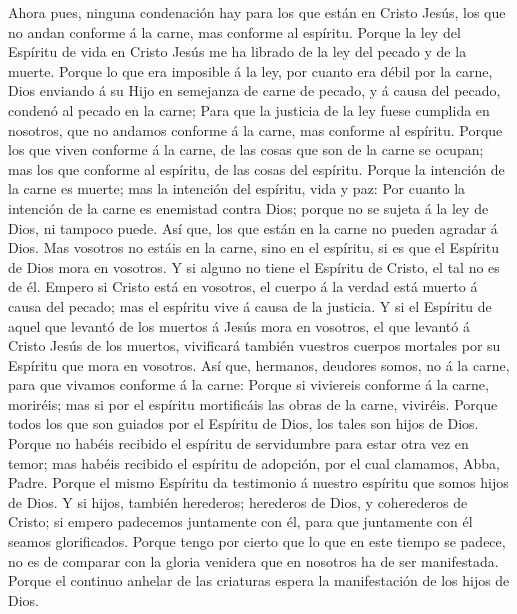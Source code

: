  Ahora pues, ninguna condenación hay para los que están en
Cristo Jesús, los que no andan conforme á la carne, mas conforme al
espíritu.  Porque la ley del Espíritu de vida en Cristo
Jesús me ha librado de la ley del pecado y de la muerte. 
Porque lo que era imposible á la ley, por cuanto era débil por la carne,
Dios enviando á su Hijo en semejanza de carne de pecado, y á causa del
pecado, condenó al pecado en la carne;  Para que la justicia
de la ley fuese cumplida en nosotros, que no andamos conforme á la
carne, mas conforme al espíritu.  Porque los que viven
conforme á la carne, de las cosas que son de la carne se ocupan; mas los
que conforme al espíritu, de las cosas del espíritu.  Porque
la intención de la carne es muerte; mas la intención del espíritu, vida
y paz:  Por cuanto la intención de la carne es enemistad
contra Dios; porque no se sujeta á la ley de Dios, ni tampoco puede.
 Así que, los que están en la carne no pueden agradar á
Dios.  Mas vosotros no estáis en la carne, sino en el
espíritu, si es que el Espíritu de Dios mora en vosotros. Y si alguno no
tiene el Espíritu de Cristo, el tal no es de él.  Empero si
Cristo está en vosotros, el cuerpo á la verdad está muerto á causa del
pecado; mas el espíritu vive á causa de la justicia.  Y si
el Espíritu de aquel que levantó de los muertos á Jesús mora en
vosotros, el que levantó á Cristo Jesús de los muertos, vivificará
también vuestros cuerpos mortales por su Espíritu que mora en vosotros.
 Así que, hermanos, deudores somos, no á la carne, para que
vivamos conforme á la carne:  Porque si viviereis conforme
á la carne, moriréis; mas si por el espíritu mortificáis las obras de la
carne, viviréis.  Porque todos los que son guiados por el
Espíritu de Dios, los tales son hijos de Dios.  Porque no
habéis recibido el espíritu de servidumbre para estar otra vez en temor;
mas habéis recibido el espíritu de adopción, por el cual clamamos, Abba,
Padre.  Porque el mismo Espíritu da testimonio á nuestro
espíritu que somos hijos de Dios.  Y si hijos, también
herederos; herederos de Dios, y coherederos de Cristo; si empero
padecemos juntamente con él, para que juntamente con él seamos
glorificados.  Porque tengo por cierto que lo que en este
tiempo se padece, no es de comparar con la gloria venidera que en
nosotros ha de ser manifestada.  Porque el continuo anhelar
de las criaturas espera la manifestación de los hijos de Dios.
